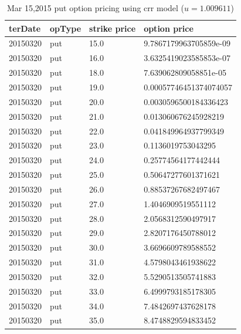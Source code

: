 \begin{table}[H]
\centering
\caption{Mar 15,2015  put option pricing using crr model ($u=1.009611$)}
\label{marp}
\begin{tabular}{l|l|l|l}
\hline
\textbf{terDate}&\textbf{opType}&\textbf{strike price}&\textbf{option price}\\
\hline
20150320&put&15.0&9.7867179963705859e-09\\
20150320&put&16.0&3.6325419023585853e-07\\
20150320&put&18.0&7.639062809058851e-05\\
20150320&put&19.0&0.00057746451374074057\\
20150320&put&20.0&0.0030596500184336423\\
20150320&put&21.0&0.013060676245928219\\
20150320&put&22.0&0.041849964937799349\\
20150320&put&23.0&0.1136019753043295\\
20150320&put&24.0&0.25774564177442444\\
20150320&put&25.0&0.50647277601371621\\
20150320&put&26.0&0.88537267682497467\\
20150320&put&27.0&1.4046909519551112\\
20150320&put&28.0&2.0568312590497917\\
20150320&put&29.0&2.8207176450788012\\
20150320&put&30.0&3.6696609789588552\\
20150320&put&31.0&4.5798043461938622\\
20150320&put&32.0&5.5290513505741883\\
20150320&put&33.0&6.4999793185178305\\
20150320&put&34.0&7.4842697437628178\\
20150320&put&35.0&8.4748829594833452\\
\hline
\end{tabular}
\end{table}\noindent









